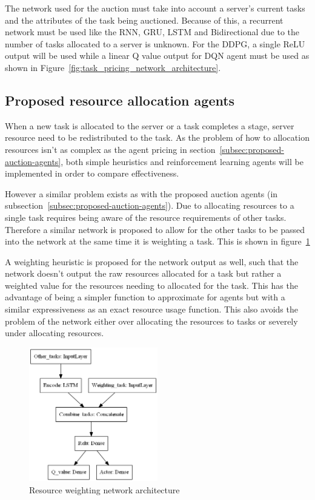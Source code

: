 The network used for the auction must take into account a server's current tasks and the attributes of the task being
auctioned. Because of this, a recurrent network must be used like the RNN, GRU, LSTM and Bidirectional due to the number
of tasks allocated to a server is unknown. For the DDPG, a single ReLU output will be used while a linear Q value output
for DQN agent must be used as shown in Figure~\ref{fig:task_pricing_network_architecture}.

\subsection{Proposed resource allocation agents}\label{subsec:proposed-resource-allocation-agents}
When a new task is allocated to the server or a task completes a stage, server resource need to be redistributed
to the task. As the problem of how to allocation resources isn't as complex as the agent pricing in
section~\ref{subsec:proposed-auction-agents}, both simple heuristics and reinforcement learning agents will be
implemented in order to compare effectiveness.

However a similar problem exists as with the proposed auction agents (in subsection~\ref{subsec:proposed-auction-agents}).
Due to allocating resources to a single task requires being aware of the resource requirements of other
tasks. Therefore a similar network is proposed to allow for the other tasks
to be passed into the network at the same time it is weighting a task. This is shown in
figure~\ref{fig:resource_weighting_network_architecture}

A weighting heuristic is proposed for the network output as well, such that the network doesn't output the raw
resources allocated for a task but rather a weighted value for the resources needing to allocated for the task.
This has the advantage of being a simpler function to approximate for agents but with a similar expressiveness as an
exact resource usage function. This also avoids the problem of the network either over allocating the resources to tasks
or severely under allocating resources.

\begin{figure}[h]
    \centering
    \includegraphics[width=0.5\textwidth]{figures/3_solution_figs/resource_weighting_network_architecture.png}
    \caption{Resource weighting network architecture}
    \label{fig:resource_weighting_network_architecture}
\end{figure}


